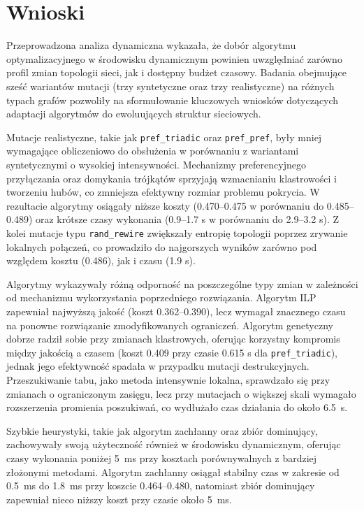 \section{Wnioski}

Przeprowadzona analiza dynamiczna wykazała, że dobór algorytmu optymalizacyjnego w środowisku dynamicznym powinien uwzględniać zarówno profil zmian topologii sieci, jak i dostępny budżet czasowy. Badania obejmujące sześć wariantów mutacji (trzy syntetyczne oraz trzy realistyczne) na różnych typach grafów pozwoliły na sformułowanie kluczowych wniosków dotyczących adaptacji algorytmów do ewoluujących struktur sieciowych.

Mutacje realistyczne, takie jak \texttt{pref\_triadic} oraz \texttt{pref\_pref}, były mniej wymagające obliczeniowo do obsłużenia w porównaniu z wariantami syntetycznymi o wysokiej intensywności. Mechanizmy preferencyjnego przyłączania oraz domykania trójkątów sprzyjają wzmacnianiu klastrowości i tworzeniu hubów, co zmniejsza efektywny rozmiar problemu pokrycia. W rezultacie algorytmy osiągały niższe koszty (0.470--0.475 w porównaniu do 0.485--0.489) oraz krótsze czasy wykonania (0.9--1.7 s w porównaniu do 2.9--3.2 s). Z kolei mutacje typu \texttt{rand\_rewire} zwiększały entropię topologii poprzez zrywanie lokalnych połączeń, co prowadziło do najgorszych wyników zarówno pod względem kosztu (0.486), jak i czasu (1.9 s).

Algorytmy wykazywały różną odporność na poszczególne typy zmian w zależności od mechanizmu wykorzystania poprzedniego rozwiązania. Algorytm ILP zapewniał najwyższą jakość (koszt 0.362--0.390), lecz wymagał znacznego czasu na ponowne rozwiązanie zmodyfikowanych ograniczeń. Algorytm genetyczny dobrze radził sobie przy zmianach klastrowych, oferując korzystny kompromis między jakością a czasem (koszt 0.409 przy czasie 0.615 s dla \texttt{pref\_triadic}), jednak jego efektywność spadała w przypadku mutacji destrukcyjnych. Przeszukiwanie tabu, jako metoda intensywnie lokalna, sprawdzało się przy zmianach o ograniczonym zasięgu, lecz przy mutacjach o większej skali wymagało rozszerzenia promienia poszukiwań, co wydłużało czas działania do około \SI{6.5}{\second}.

Szybkie heurystyki, takie jak algorytm zachłanny oraz zbiór dominujący, zachowywały swoją użyteczność również w środowisku dynamicznym, oferując czasy wykonania poniżej \SI{5}{\milli\second} przy kosztach porównywalnych z bardziej złożonymi metodami. Algorytm zachłanny osiągał stabilny czas w zakresie od \SI{0.5}{\milli\second} do \SI{1.8}{\milli\second} przy koszcie 0.464--0.480, natomiast zbiór dominujący zapewniał nieco niższy koszt przy czasie około \SI{5}{\milli\second}.

